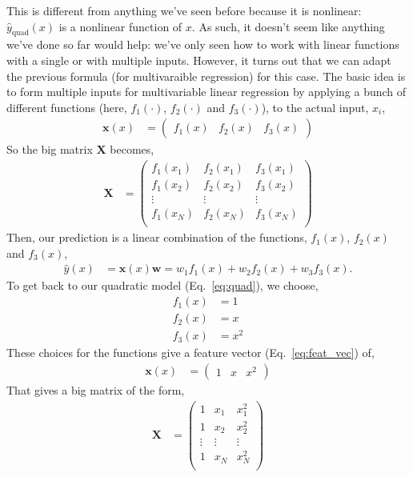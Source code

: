 \documentclass{article}
\newcommand{\yh}{\hat{y}}
\newcommand{\x}{\mathbf{x}}
\newcommand{\X}{\mathbf{X}}
\newcommand{\w}{\mathbf{w}}
\begin{document}
This is different from anything we've seen before because it is nonlinear: $\yh_\text{quad}(x)$ is a nonlinear function of $x$.
As such, it doesn't seem like anything we've done so far would help: we've only seen how to work with linear functions with a single or with multiple inputs.
However, it turns out that we can adapt the previous formula (for multivaraible regression) for this case.
The basic idea is to form multiple inputs for multivariable linear regression by applying a bunch of different functions (here, $f_1(\cdot)$, $f_2(\cdot)$ and $f_3(\cdot)$), to the actual input, $x_i$,
\begin{align}
  \label{eq:feat_vec}
  \x(x) &= \begin{pmatrix} f_1(x) & f_2(x) & f_3(x) \end{pmatrix}
\end{align}
So the big matrix $\X$ becomes,
\begin{align}
  \X &= \begin{pmatrix}
    f_1(x_1) & f_2(x_1) & f_3(x_1)\\
    f_1(x_2) & f_2(x_2) & f_3(x_2)\\
    \vdots & \vdots & \vdots\\
    f_1(x_N) & f_2(x_N) & f_3(x_N)\\
  \end{pmatrix}
\end{align}
Then, our prediction is a linear combination of the functions, $f_1(x)$, $f_2(x)$ and $f_3(x)$,
\begin{align}
  \label{eq:nonlin_yh}
  \yh(x) &= \x(x) \w = w_1 f_1(x) + w_2 f_2(x) + w_3 f_3(x).
\end{align}
To get back to our quadratic model (Eq.~\ref{eq:quad}), we choose,
\begin{align}
  f_1(x) &= 1\\
  f_2(x) &= x\\
  f_3(x) &= x^2
\end{align}
These choices for the functions give a feature vector (Eq.~\ref{eq:feat_vec}) of,
\begin{align}
  \x(x) &= \begin{pmatrix} 1 & x & x^2 \end{pmatrix}
\end{align}
That gives a big matrix of the form,
\begin{align}
  \X &= \begin{pmatrix}
    1 & x_1 & x_1^2\\
    1 & x_2 & x_2^2\\
    \vdots & \vdots & \vdots\\
    1 & x_N & x_N^2\\
  \end{pmatrix}
\end{align}
\end{document}
